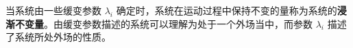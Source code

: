 
当系统由一些缓变参数 $\lambda_i$ 确定时，系统在运动过程中保持不变的量称为系统的\textbf{浸渐不变量}。由缓变参数描述的系统可以理解为处于一个外场当中，而参数 $\lambda_i$ 描述了系统所处外场的性质。
